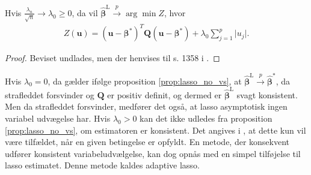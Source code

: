 \begin{prop}\label{prop:lasso_no_vs}
Hvis $\frac{\lambda_n}{\sqrt{n}} \rightarrow \lambda_0 \geq 0$, da vil $\hat{\boldsymbol{\beta}}^\text{L} \overset{p}{\rightarrow} \arg \min Z$, hvor
\begin{align*}
Z(\mathbf{u})=(\mathbf{u}- \boldsymbol{\beta}^*)^T \mathbf{Q} (\mathbf{u}-\boldsymbol{\beta}^*)+\lambda_0 \sum_{j=1}^p \vert u_j \vert.
\end{align*}
\end{prop}
\begin{proof}
Beviset undlades, men der henvises til s. 1358 i \cite{Knight}.
\end{proof}
Hvis $\lambda_0=0$, da gælder ifølge proposition \ref{prop:lasso_no_vs}, at $\hat{\boldsymbol{\beta}}^\text{L} \overset{p}{\rightarrow} \hat{\boldsymbol{\beta}}^{*}$, da strafleddet forsvinder og $\mathbf{Q}$ er positiv definit, og dermed er $\hat{\boldsymbol{\beta}}^\text{L}$ svagt konsistent. Men da strafleddet forsvinder, medfører det også, at lasso asymptotisk ingen variabel udvægelse har. Hvis $\lambda_0>0$ kan det ikke udledes fra proposition \ref{prop:lasso_no_vs}, om estimatoren er konsistent. Det angives i \citep{Zou}, at dette kun vil være tilfældet, når en given betingelse er opfyldt. En metode, der konsekvent udfører konsistent variabeludvælgelse, kan dog opnås med en simpel tilføjelse til lasso estimatet. Denne metode kaldes adaptive lasso.
